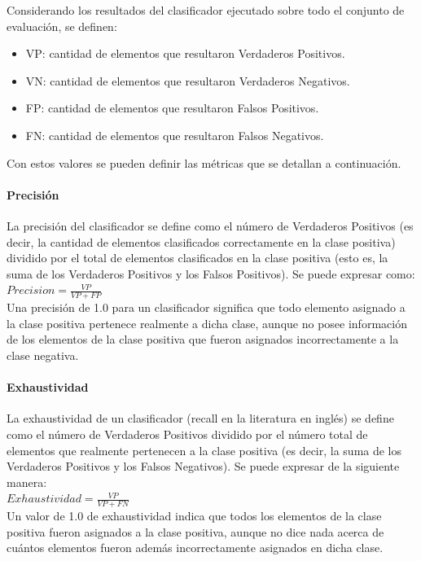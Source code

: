 \documentclass[a4paper,11pt,spanish]{book}
\begin{document}
	  Considerando los resultados del clasificador ejecutado sobre todo el conjunto de evaluación, se definen:
	  \begin{itemize}	
	    \item VP: cantidad de elementos que resultaron Verdaderos Positivos.
	    \item VN: cantidad de elementos que resultaron Verdaderos Negativos.
	    \item FP: cantidad de elementos que resultaron Falsos Positivos.
	    \item FN: cantidad de elementos que resultaron Falsos Negativos.
	  \end{itemize}	  
	  
	  Con estos valores se pueden definir las métricas que se detallan a continuación.
	  
	  \paragraph { Precisión }
	    La precisión del clasificador se define como el número de Verdaderos Positivos (es decir, la cantidad de elementos clasificados correctamente en la clase positiva)
	    dividido por el total de elementos clasificados en la clase positiva (esto es, la suma de los Verdaderos Positivos y los Falsos Positivos). Se puede expresar como:\\
	    $ Precision = {\frac {VP}{VP+FP}}$\\
	    Una precisión de 1.0 para un clasificador significa que todo elemento asignado a la clase positiva pertenece realmente a dicha clase, aunque no posee información
	    de los elementos de la clase positiva que fueron asignados incorrectamente a la clase negativa.
	  
	  \paragraph { Exhaustividad }  
	    La exhaustividad de un clasificador (recall en la literatura en inglés) se define como el número de Verdaderos Positivos dividido por el número total de elementos que 
	    realmente pertenecen a la clase positiva (es decir, la suma de los Verdaderos Positivos y los Falsos Negativos). Se puede expresar de la siguiente manera:\\
	    $ Exhaustividad = {\frac {VP}{VP+FN}}$\\
	    Un valor de 1.0 de exhaustividad indica que todos los elementos de la clase positiva fueron asignados a la clase positiva, aunque no dice nada acerca de cuántos elementos 
	    fueron además incorrectamente asignados en dicha clase.
	    
\end{document}
